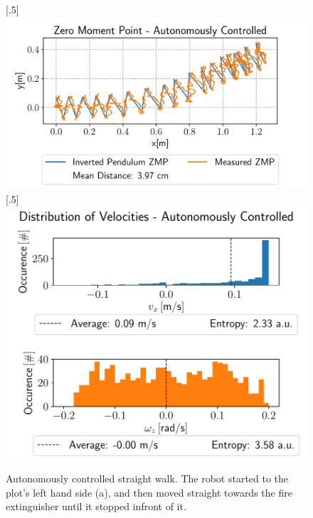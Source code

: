 \begin{figure}[h!]
	[.5\linewidth]{\includegraphics[scale=.45]{chapters/04_experiments/02_autonomous_walking/straight_walk_01_zmp.pdf}}
	[.5\linewidth]{\includegraphics[scale=.45]{chapters/04_experiments/02_autonomous_walking/straight_walk_01_entropy.pdf}}
	\caption{Autonomously controlled straight walk. The robot started to the plot's left hand side (a), and then moved straight towards the fire extinguisher until it stopped infront of it.}
\label{fig::424_aw_basic_straight}
\end{figure} 
